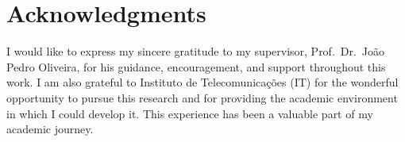 \chapter*{Acknowledgments}

\noindent
I would like to express my sincere gratitude to my supervisor, Prof.\ Dr.\
João Pedro Oliveira, for his guidance, encouragement, and support throughout
this work. I am also grateful to Instituto de Telecomunicações (IT)
for the wonderful opportunity to pursue this research and for providing the
academic environment in which I could develop it. This experience has been a
valuable part of my academic journey.

\clearpage
